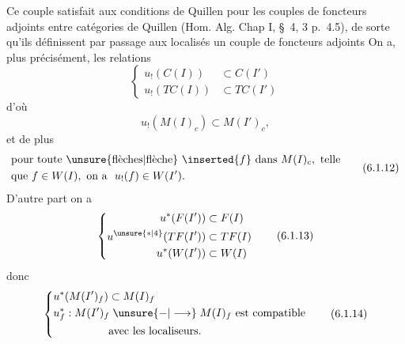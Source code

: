 
Ce couple satisfait aux conditions de Quillen
pour les couples de foncteurs adjoints entre
catégories de Quillen (Hom. Alg. Chap I,
\S~4,  3 p.~4.5), de sorte qu'ils
définissent par passage aux localisés un
couple de foncteurs adjoints
On a, plus précisément, les relations
\[
\left\{\begin{aligned}
 u_{!}(C(I))&\subset C(I')\\
 u_{!}(TC(I))&\subset TC(I')
\end{aligned}\right.\tag*{(6.1.10)}
\]
d'où
\[
 u_{!}(M(I)_{c})\subset M(I')_{c},\tag*{(6.1.11)}
\]
et de plus
\[
\begin{aligned}
 &\text{pour toute \unsure{flèches|flèche} }\inserted{f}\ \text{dans }M(I)_{c},\text{ telle}\\
 &\text{que }f\in W(I),\ \text{on a }\ u_{!}(f)\in W(I').
\end{aligned}\tag*{(6.1.12)}
\]
D'autre part on a
\[
\left\{\begin{aligned}
 u^{*}(F(I'))&\subset F(I)\\
 u^{\unsure{*|4}}(TF(I'))&\subset TF(I)\\
 u^{*}(W(I'))&\subset W(I)
\end{aligned}\right.\tag*{(6.1.13)}
\]
donc
\[
\left\{\begin{aligned}
 &u^{*}(M(I')_{f})\subset M(I)_{f}\\
 &u^{*}_{f}:M(I')_{f}\mathrel{\unsure{-|\longrightarrow}}M(I)_{f}\ \text{est compatible}\\
 &\hspace{5em}\text{avec les localiseurs}.
\end{aligned}\right.\tag*{(6.1.14)}
\]

